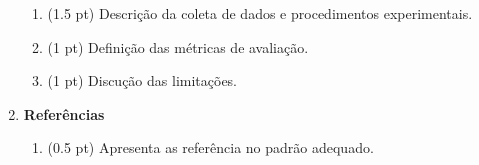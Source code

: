 \documentclass[12pt,a4paper, brazil]{article}
\begin{document}
\begin{enumerate}
\begin{enumerate}
            \item (1.5 pt) Descrição da coleta de dados e procedimentos experimentais.
            \item (1 pt) Definição das métricas de avaliação. 
            \item (1 pt) Discução das limitações.
        \end{enumerate}
    \item \textbf{Referências}
        \begin{enumerate}
            \item (0.5 pt) Apresenta as referência no padrão adequado. 
        \end{enumerate}
\end{enumerate}


    


\printbibliography
\end{document}

